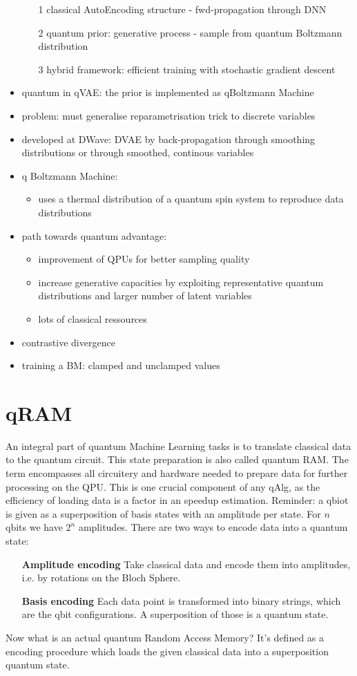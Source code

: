 \begin{itemize}
  \begin{itemize}
\item[1] classical AutoEncoding structure - fwd-propagation through DNN
\item[2] quantum prior: generative process - sample from quantum Boltzmann
  distribution
\item[3] hybrid framework: efficient training with stochastic gradient descent
  \end{itemize}
  \item quantum in qVAE: the prior is implemented as qBoltzmann Machine
  \item problem: must generalise reparametrisation trick to discrete variables
  \item developed at DWave: DVAE by back-propagation through smoothing distributions or
	through smoothed, continous variables
\item q Boltzmann Machine:
  \begin{itemize}
	\item uses a thermal distribution of a quantum spin system to reproduce data
	  distributions
  \end{itemize}
\item path towards quantum advantage:
  \begin{itemize}
	\item improvement of QPUs for better sampling quality
	\item increase generative capacities by exploiting representative quantum
	  distributions and larger number of latent variables
	\item lots of classical ressources
  \end{itemize}
  \item contrastive divergence
  \item training a BM: clamped and unclamped values
\end{itemize}

\section{qRAM}
An integral part of quantum Machine Learning tasks is to translate classical
data to the quantum circuit. This state preparation is also called quantum RAM.
The term encompasses all circuitery and hardware needed to prepare data for
further processing on the QPU. This is one crucial component of any qAlg, as the
efficiency of loading data is a factor in an speedup estimation.
Reminder: a qbiot is given as a superposition of basis states with an amplitude
per state. For $n$ qbits we have $2^n$ amplitudes.
There are two ways to encode data into a quantum state:
\begin{itemize}
  \item[\textbf{Amplitude encoding}] Take classical data and encode them into
	amplitudes, i.e. by rotations on the Bloch Sphere.
  \item[\textbf{Basis encoding}] Each data point is transformed into binary
	strings, which are the qbit configurations. A superposition of those is a
	quantum state.
\end{itemize}
Now what is an actual quantum Random Access Memory? It's defined as a encoding
procedure which loads the given classical data into a superposition quantum
state.
